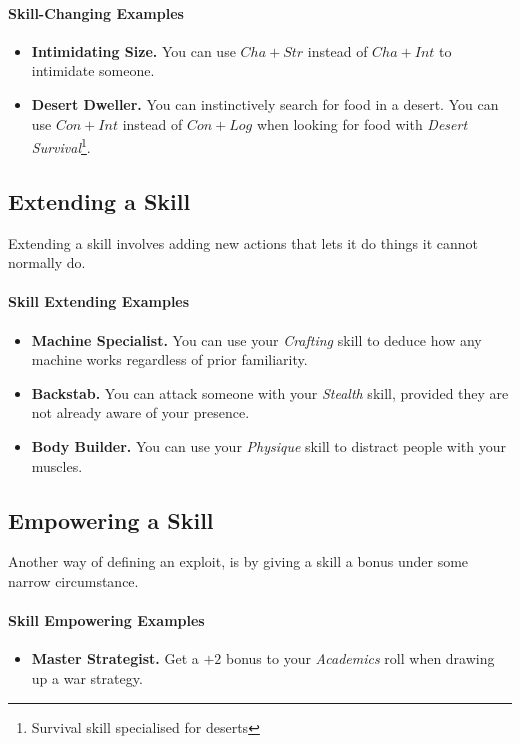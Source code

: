 \paragraph{Skill-Changing Examples}
\begin{itemize}
    \item \textbf{Intimidating Size.} You can use $Cha+Str$ instead of $Cha+Int$ to intimidate someone.
    \item \textbf{Desert Dweller.} You can instinctively search for food in a desert. You can use $Con+Int$ instead of $Con+Log$ when looking for food with \textit{Desert Survival}\footnote{Survival skill specialised for deserts}.
\end{itemize}

\subsection{Extending a Skill}
Extending a skill involves adding new actions that lets it do things it cannot normally do.

\paragraph{Skill Extending Examples}
\begin{itemize}
    \item \textbf{Machine Specialist.} You can use your \textit{Crafting} skill to deduce how any machine works regardless of prior familiarity.
    \item \textbf{Backstab.} You can attack someone with your \textit{Stealth} skill, provided they are not already aware of your presence.
    \item \textbf{Body Builder.} You can use your \textit{Physique} skill to distract people with your muscles.
\end{itemize}

\subsection{Empowering a Skill}
Another way of defining an exploit, is by giving a skill a bonus under some narrow circumstance.

\paragraph{Skill Empowering Examples}
\begin{itemize}
    \item \textbf{Master Strategist.} Get a $+2$ bonus to your \textit{Academics} roll when drawing up a war strategy.
\end{itemize}

